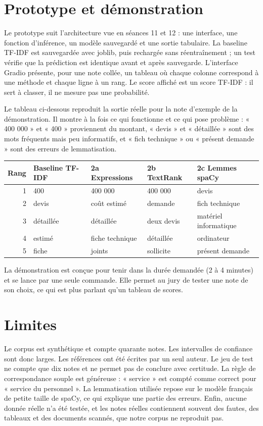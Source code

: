 \documentclass[11pt,a4paper]{article}
\begin{document}
\section{Prototype et démonstration}

Le prototype suit l'architecture vue en séances 11 et 12 : une interface, une fonction d'inférence, un modèle sauvegardé et une sortie tabulaire. La baseline TF-IDF est sauvegardée avec joblib, puis rechargée sans réentraînement ; un test vérifie que la prédiction est identique avant et après sauvegarde. L'interface Gradio présente, pour une note collée, un tableau où chaque colonne correspond à une méthode et chaque ligne à un rang. Le score affiché est un score TF-IDF : il sert à classer, il ne mesure pas une probabilité.

Le tableau ci-dessous reproduit la sortie réelle pour la note d'exemple de la démonstration. Il montre à la fois ce qui fonctionne et ce qui pose problème : « 400 000 » et « 400 » proviennent du montant, « devis » et « détaillée » sont des mots fréquents mais peu informatifs, et « fich technique » ou « présent demande » sont des erreurs de lemmatisation.

\begin{center}
{\small
\begin{tabular}{rllll}
\toprule
Rang & Baseline TF-IDF & 2a Expressions & 2b TextRank & 2c Lemmes spaCy \\
\midrule
1 & 400 & 400 000 & 400 000 & devis \\
2 & devis & coût estimé & demande & fich technique \\
3 & détaillée & détaillée & deux devis & matériel informatique \\
4 & estimé & fiche technique & détaillée & ordinateur \\
5 & fiche & joints & sollicite & présent demande \\
\bottomrule
\end{tabular}
}
\end{center}

La démonstration est conçue pour tenir dans la durée demandée (2 à 4 minutes) et se lance par une seule commande. Elle permet au jury de tester une note de son choix, ce qui est plus parlant qu'un tableau de scores.

\section{Limites}

Le corpus est synthétique et compte quarante notes. Les intervalles de confiance sont donc larges. Les références ont été écrites par un seul auteur. Le jeu de test ne compte que dix notes et ne permet pas de conclure avec certitude. La règle de correspondance souple est généreuse : « service » est compté comme correct pour « service du personnel ». La lemmatisation utilisée repose sur le modèle français de petite taille de spaCy, ce qui explique une partie des erreurs. Enfin, aucune donnée réelle n'a été testée, et les notes réelles contiennent souvent des fautes, des tableaux et des documents scannés, que notre corpus ne reproduit pas.
\end{document}
